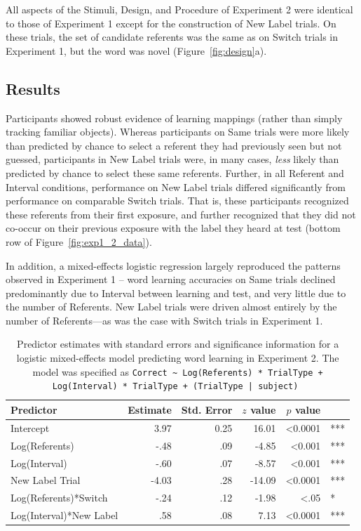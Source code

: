 \documentclass[man,floatsintext]{apa6}
\begin{document}
All aspects of the Stimuli, Design, and Procedure of Experiment 2 were identical to those of Experiment 1 except for the construction of New Label trials. On these trials, the set of candidate referents was the same as on Switch trials in Experiment 1, but the word was novel (Figure~\ref{fig:design}a).

\subsection{Results}

Participants showed robust evidence of learning mappings (rather than simply tracking familiar objects). Whereas participants on Same trials were more likely than predicted by chance to select a referent they had previously seen but not guessed, participants in New Label trials were, in many cases, \emph{less} likely than predicted by chance to select these same referents. Further, in all Referent and Interval conditions, performance on New Label trials differed significantly from performance on comparable Switch trials. That is, these participants recognized these referents from their first exposure, and further recognized that they did not co-occur on their previous exposure with the label they heard at test (bottom row of Figure~\ref{fig:exp1_2_data}).

In addition, a mixed-effects logistic regression largely reproduced the patterns observed in Experiment 1 -- word learning accuracies on Same trials declined predominantly due to Interval between learning and test, and very little due to the number of Referents. New Label trials were driven almost entirely by the number of Referents---as was the case with Switch trials in Experiment 1.

\begin{table}
\begin{center}
\begin{tabular}{lrrrrl}
\hline
Predictor & Estimate & Std. Error & $z$ value & $p$ value & \\
\hline
Intercept & 3.97 & 0.25  & 16.01 &  <0.0001 & ***  \\
Log(Referents)  & -.48 & .09  & -4.85 &  <0.001 & ***   \\
Log(Interval)  & -.60 & .07  & -8.57 &  <0.001 & ***  \\
New Label Trial  & -4.03 & .28  & -14.09 &  <0.0001 & ***   \\
Log(Referents)*Switch  & -.24 & .12  & -1.98 &  <.05 & * \\
Log(Interval)*New Label  & .58 & .08 & 7.13 &  <0.0001 & ***   \\
\hline
\end{tabular}
\end{center}
\caption{\label{tab:exp2_reg}Predictor estimates with standard errors and significance information for a logistic mixed-effects model predicting word learning in Experiment 2. The model was specified as \small{\tt{Correct \textasciitilde \hspace{1pt} Log(Referents) * TrialType + Log(Interval) * TrialType + (TrialType | subject)} }}
\end{table}
\end{document}
